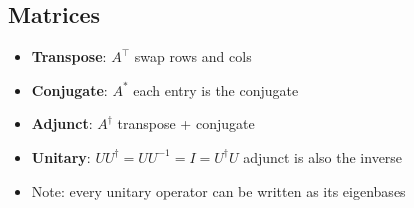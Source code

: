 \documentclass[12pt,a4paper]{article}
\begin{document}
\subsection{Matrices}
\begin{itemize}
\item \textbf{Transpose}: $A^\top$ swap rows and cols
\item \textbf{Conjugate}: $A^*$ each entry is the conjugate
\item \textbf{Adjunct}: $A^\dagger$ transpose + conjugate
\item \textbf{Unitary}: $UU^\dagger = UU^{-1} = I = U^\dagger U$ adjunct is also the inverse
\item Note: every unitary operator can be written as its eigenbases
\end{itemize}
\end{document}
